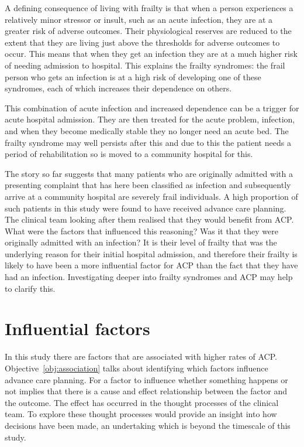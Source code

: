 \documentclass
[
	12pt,
	a4paper,
	oneside,
]{report}
\begin{document}
A defining consequence of living with frailty is that when a person 
experiences a relatively minor stressor or insult, such as an acute infection, 
they are at a greater risk of adverse outcomes. Their physiological reserves
are reduced to the extent that they are living just above the thresholds 
for adverse outcomes to occur. This means that when they get an infection
they are at a much higher risk of needing admission to hospital. This explains
the frailty syndromes: the frail person who gets an infection is at a high 
risk of developing one of these syndromes, each of which increases their 
dependence on others.

This combination of acute infection and increased dependence can be a trigger
for acute hospital admission. They are then treated for the acute problem,
infection, and when they become medically stable they no longer need an acute
bed. The frailty syndrome may well persists after this and due to this the
patient needs a period of rehabilitation so is moved to a community hospital
for this.

The story so far suggests that many patients who are originally admitted with
a presenting complaint that has here been classified as infection and 
subsequently arrive at a community hospital are severely frail individuals.
A high proportion of such patients in this study were found to have received
advance care planning. The clinical team looking after them realised that they
would benefit from ACP. What were the factors that influenced this reasoning?
Was it that they were originally admitted with an infection? It is their level
of frailty that was the underlying reason for their initial hospital admission,
and therefore their frailty is likely to have been a more influential factor
for ACP than the fact that they have had an infection. Investigating deeper
into frailty syndromes and ACP may help to clarify this.

\section{Influential factors}

In this study there are factors that are associated with higher rates of ACP.
Objective~\ref{obj:association} talks about identifying which factors 
influence advance care planning.
For a factor to influence whether something happens or not implies that there 
is a cause and effect relationship between the factor and the outcome. 
The effect has occurred in the thought processes of the clinical team. To 
explore these thought processes would provide an insight into how decisions
have been made, an undertaking which is beyond the timescale of this study.
\end{document}
